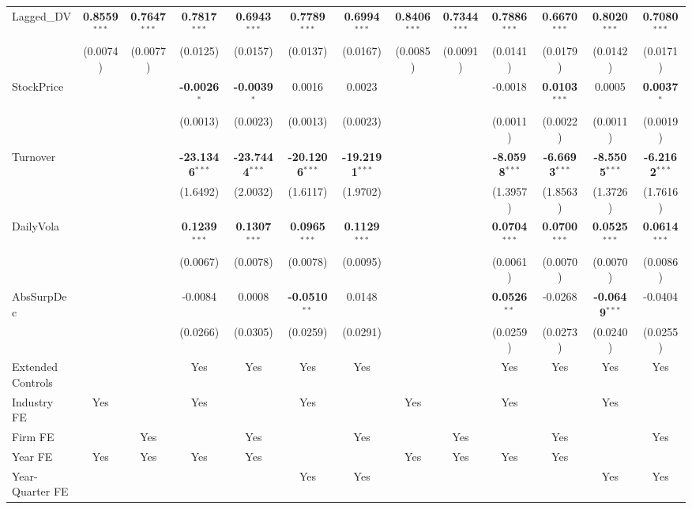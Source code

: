 \begin{landscape}
\begin{table}[H]
\begin{tabular}{lcccccccccccc}
Lagged\_DV & \textbf{0.8559}$^{***}$ & \textbf{0.7647}$^{***}$ & \textbf{0.7817}$^{***}$ & \textbf{0.6943}$^{***}$ & \textbf{0.7789}$^{***}$ & \textbf{0.6994}$^{***}$ & \textbf{0.8406}$^{***}$ & \textbf{0.7344}$^{***}$ & \textbf{0.7886}$^{***}$ & \textbf{0.6670}$^{***}$ & \textbf{0.8020}$^{***}$ & \textbf{0.7080}$^{***}$ \\
 & (0.0074) & (0.0077) & (0.0125) & (0.0157) & (0.0137) & (0.0167) & (0.0085) & (0.0091) & (0.0141) & (0.0179) & (0.0142) & (0.0171) \\
StockPrice &  &  & \textbf{-0.0026}$^{*}$ & \textbf{-0.0039}$^{*}$ & 0.0016 & 0.0023 &  &  & -0.0018 & \textbf{0.0103}$^{***}$ & 0.0005 & \textbf{0.0037}$^{*}$ \\
 &  &  & (0.0013) & (0.0023) & (0.0013) & (0.0023) &  &  & (0.0011) & (0.0022) & (0.0011) & (0.0019) \\
Turnover &  &  & \textbf{-23.1346}$^{***}$ & \textbf{-23.7444}$^{***}$ & \textbf{-20.1206}$^{***}$ & \textbf{-19.2191}$^{***}$ &  &  & \textbf{-8.0598}$^{***}$ & \textbf{-6.6693}$^{***}$ & \textbf{-8.5505}$^{***}$ & \textbf{-6.2162}$^{***}$ \\
 &  &  & (1.6492) & (2.0032) & (1.6117) & (1.9702) &  &  & (1.3957) & (1.8563) & (1.3726) & (1.7616) \\
DailyVola &  &  & \textbf{0.1239}$^{***}$ & \textbf{0.1307}$^{***}$ & \textbf{0.0965}$^{***}$ & \textbf{0.1129}$^{***}$ &  &  & \textbf{0.0704}$^{***}$ & \textbf{0.0700}$^{***}$ & \textbf{0.0525}$^{***}$ & \textbf{0.0614}$^{***}$ \\
 &  &  & (0.0067) & (0.0078) & (0.0078) & (0.0095) &  &  & (0.0061) & (0.0070) & (0.0070) & (0.0086) \\
AbsSurpDec &  &  & -0.0084 & 0.0008 & \textbf{-0.0510}$^{**}$ & 0.0148 &  &  & \textbf{0.0526}$^{**}$ & -0.0268 & \textbf{-0.0649}$^{***}$ & -0.0404 \\
 &  &  & (0.0266) & (0.0305) & (0.0259) & (0.0291) &  &  & (0.0259) & (0.0273) & (0.0240) & (0.0255) \\
\midrule
Extended Controls &  &  & Yes & Yes & Yes & Yes &  &  & Yes & Yes & Yes & Yes \\
Industry FE & Yes &  & Yes &  & Yes &  & Yes &  & Yes &  & Yes &  \\
Firm FE &  & Yes &  & Yes &  & Yes &  & Yes &  & Yes &  & Yes \\
Year FE & Yes & Yes & Yes & Yes &  &  & Yes & Yes & Yes & Yes &  &  \\
Year-Quarter FE &  &  &  &  & Yes & Yes &  &  &  &  & Yes & Yes \\

\end{tabular}
\end{table}
\end{landscape}
